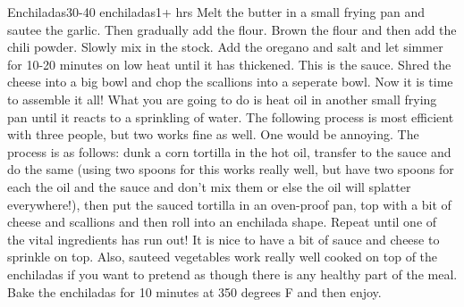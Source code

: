 \begin{recipe}{Enchiladas}{30-40 enchiladas}{1+ hrs}
\freeform 
{}
Melt the butter in a small frying pan and sautee the garlic. Then gradually add the flour.
Brown the flour and then add the chili powder. Slowly mix in the stock.
Add the oregano and salt and let simmer for 10-20 minutes on low heat until it has  thickened. This is the sauce.
Shred the cheese into a big bowl and chop the scallions into a seperate bowl.
Now it is time to assemble it all! What you are going to do is heat oil in another small frying pan until it reacts to a sprinkling of water. The following process is most efficient with three people, but two works fine as well. One would be annoying. The process is as follows: dunk a corn tortilla in the hot oil, transfer to the sauce and do the same (using two spoons for this works really well, but have two spoons for each the oil and the sauce and don't mix them or else the oil will splatter everywhere!), then put the sauced tortilla in an oven-proof pan, top with a bit of cheese and scallions and then roll into an enchilada shape. Repeat until one of the vital ingredients has run out! It is nice to have a bit of sauce and cheese to sprinkle on top. Also, sauteed vegetables work really well cooked on top of the enchiladas if you want to pretend as though there is any healthy part of the meal. Bake the enchiladas for 10 minutes at 350 degrees F and then enjoy.
\end{recipe}
